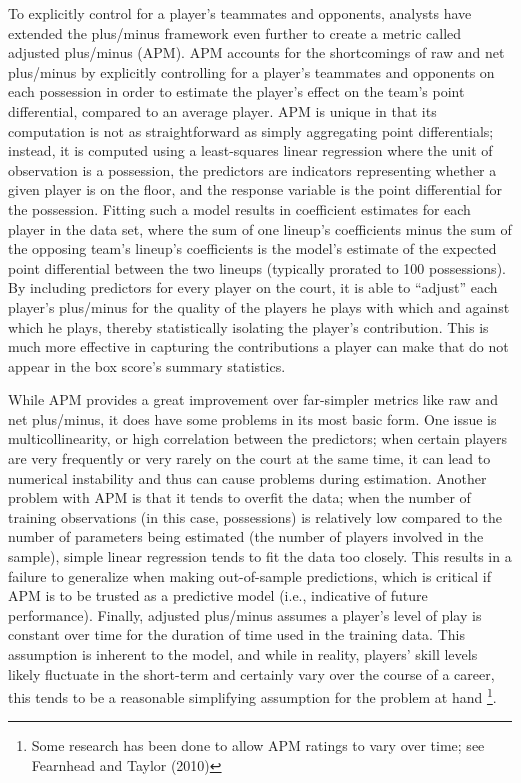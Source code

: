 To explicitly control for a player's teammates and opponents, analysts have extended
the plus/minus framework even further to create a metric called adjusted plus/minus
(APM). APM accounts for the shortcomings of raw and net plus/minus by explicitly
controlling for a player's teammates and opponents on each possession in order to
estimate the player's effect on the team's point differential, compared to an
average player. APM is unique in that its computation is not as straightforward as
simply aggregating point differentials; instead, it is computed using a
least-squares linear regression where the unit of observation is a possession, the
predictors are indicators representing whether a given player is on the floor, and
the response variable is the point differential for the possession. Fitting such a
model results in coefficient estimates for each player in the data set, where the
sum of one lineup's coefficients minus the sum of the opposing team's lineup's
coefficients is the model's estimate of the expected point differential between the
two lineups (typically prorated to 100 possessions). By including predictors for
every player on the court, it is able to ``adjust'' each player's plus/minus for the
quality of the players he plays with which and against which he plays, thereby
statistically isolating the player's contribution. This is much more effective in
capturing the contributions a player can make that do not appear in the box score's
summary statistics.

While APM provides a great improvement over far-simpler metrics like raw and net
plus/minus, it does have some problems in its most basic form. One issue is
multicollinearity, or high correlation between the predictors; when certain players
are very frequently or very rarely on the court at the same time, it can lead to
numerical instability and thus can cause problems during estimation. Another
problem with APM is that it tends to overfit the data; when the number of training
observations (in this case, possessions) is relatively low compared to the number of
parameters being estimated (the number of players involved in the sample), simple
linear regression tends to fit the data too closely. This results in a failure to
generalize when making out-of-sample predictions, which is critical if APM is to be
trusted as a predictive model (i.e., indicative of future performance). Finally,
adjusted plus/minus assumes a player's level of play is constant over time for the
duration of time used in the training data. This assumption is inherent to the
model, and while in reality, players' skill levels likely fluctuate in the
short-term and certainly vary over the course of a career, this tends to be a
reasonable simplifying assumption for the problem at hand \footnote{Some research
has been done to allow APM ratings to vary over time; see Fearnhead and Taylor
(2010)}.

